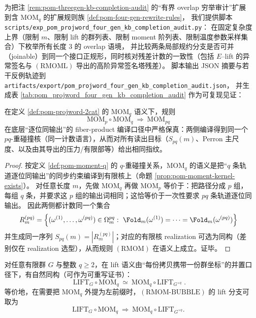 \begin{remark}\label{rem:pom-fourgen-kb-completion-audit}
为把注 \ref{rem:pom-threegen-kb-completion-audit} 的“有界 overlap 穷举审计”扩展到含 \(\mathrm{MOM}_q\) 的扩展规则族 \ref{def:pom-four-gen-rewrite-rules}，
我们提供脚本
\texttt{scripts/exp\_pom\_projword\_four\_gen\_kb\_completion\_audit.py}：
在固定复杂度上界（限制 \(m\)、限制 lift 的群列表、限制 moment 阶列表、限制温度参数采样集合）下枚举所有长度 \(3\) 的 overlap 语境，
并比较两条局部规约分支是否可并（joinable）到同一个接口正规形，同时核对残差计数的一致性（包括 \(E\)--lift 的异常签名与 \((\mathrm{RMOML})\) 导出的高阶异常签名塔残差）。
脚本输出 JSON 摘要与若干反例轨迹到
\texttt{artifacts/export/pom\_projword\_four\_gen\_kb\_completion\_audit.json}，
并生成表 \ref{tab:pom_projword_four_gen_kb_completion_audit} 作为可复现见证：

\end{remark}

\begin{proposition}\label{prop:pom-rmom-sound}
在定义 \ref{def:pom-projword-2cat} 的 \(\mathrm{MOM}_q\) 语义下，规则
\[
\mathrm{MOM}_p\circ \mathrm{MOM}_q\ \Rightarrow\ \mathrm{MOM}_{pq}
\]
在底层“逐位同输出”的 fiber-product 编译口径中严格保真：两侧编译得到同一个 \(pq\)-重碰撞核（同一计数语言），从而对所有读出目标（\(S_{pq}(m)\)、Perron 主尺度、以及由其导出的压力/有限部等）给出相同指纹。
\end{proposition}

\begin{proof}
按定义 \ref{def:pom-moment-q} 的 \(q\)-重碰撞关系，\(\mathrm{MOM}_q\) 的语义是把“\(q\) 条轨道逐位同输出”的同步约束编译到有限核上（命题 \ref{prop:pom-moment-kernel-exists}）。
对任意长度 \(m\)，先做 \(\mathrm{MOM}_q\) 再做 \(\mathrm{MOM}_p\) 等价于：把路径分成 \(p\) 组，每组 \(q\) 条，并要求这 \(p\) 组的输出词相同；这恰等价于一次性要求 \(pq\) 条轨道逐位同输出。
因此两侧都计数同一个集合
\[
R_m^{(pq)}=\Bigl\{(\omega^{(1)},\dots,\omega^{(pq)})\in\Omega_m^{pq}:\ \Fold_m(\omega^{(1)})=\cdots=\Fold_m(\omega^{(pq)})\Bigr\}
\]
并生成同一序列 \(S_{pq}(m)=|R_m^{(pq)}|\)；对应的有限核 realization 可选为同构（差别仅在 realization 选型），从而规则 \((\mathrm{RMOM})\) 在语义上成立。证毕。
\end{proof}

\begin{proposition}\label{prop:pom-mom-lift-beck-chevalley}
对任意有限群 \(G\) 与整数 \(q\ge 2\)，在 lift 语义由“每份拷贝携带一份群坐标”的并置口径下，有自然同构（可作为可重写证书）：
\[
\boxed{\;
\mathrm{LIFT}_G\circ \mathrm{MOM}_q\ \simeq\ \mathrm{MOM}_q\circ \mathrm{LIFT}_{G^{\times q}}\; }.
\]
等价地，在需要把 \(\mathrm{MOM}_q\) 外提为左前缀时，\((\mathrm{RMOM\text{-}BUBBLE})\) 的 lift 分支可取为
\[
\mathrm{LIFT}_G\circ \mathrm{MOM}_q\ \Rightarrow\ \mathrm{MOM}_q\circ \mathrm{LIFT}_{G^{\times q}}.
\]
\end{proposition}

